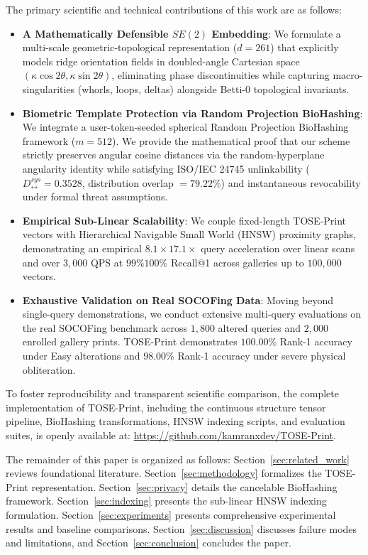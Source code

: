 \documentclass[lettersize,journal]{IEEEtran}
\begin{document}
The primary scientific and technical contributions of this work are as follows:
\begin{itemize}
    \item \textbf{A Mathematically Defensible $SE(2)$ Embedding}: We formulate a multi-scale geometric-topological representation ($d = 261$) that explicitly models ridge orientation fields in doubled-angle Cartesian space $(\kappa \cos 2\theta, \kappa \sin 2\theta)$, eliminating phase discontinuities while capturing macro-singularities (whorls, loops, deltas) alongside Betti-0 topological invariants.
    \item \textbf{Biometric Template Protection via Random Projection BioHashing}: We integrate a user-token-seeded spherical Random Projection BioHashing framework ($m = 512$). We provide the mathematical proof that our scheme strictly preserves angular cosine distances via the random-hyperplane angularity identity while satisfying ISO/IEC 24745 unlinkability ($D_{\leftrightarrow}^{sys} = 0.3528$, distribution overlap $= 79.22\%$) and instantaneous revocability under formal threat assumptions.
    \item \textbf{Empirical Sub-Linear Scalability}: We couple fixed-length TOSE-Print vectors with Hierarchical Navigable Small World (HNSW) proximity graphs, demonstrating an empirical $8.1\times$\textendash$17.1\times$ query acceleration over linear scans and over $3,000$ QPS at $99\%$\textendash$100\%$ Recall@1 across galleries up to $100,000$ vectors.
    \item \textbf{Exhaustive Validation on Real SOCOFing Data}: Moving beyond single-query demonstrations, we conduct extensive multi-query evaluations on the real SOCOFing benchmark across $1,800$ altered queries and $2,000$ enrolled gallery prints. TOSE-Print demonstrates $100.00\%$ Rank-1 accuracy under Easy alterations and $98.00\%$ Rank-1 accuracy under severe physical obliteration.
\end{itemize}

To foster reproducibility and transparent scientific comparison, the complete implementation of TOSE-Print, including the continuous structure tensor pipeline, BioHashing transformations, HNSW indexing scripts, and evaluation suites, is openly available at: \url{https://github.com/kamranxdev/TOSE-Print}.

The remainder of this paper is organized as follows: Section~\ref{sec:related_work} reviews foundational literature. Section~\ref{sec:methodology} formalizes the TOSE-Print representation. Section~\ref{sec:privacy} details the cancelable BioHashing framework. Section~\ref{sec:indexing} presents the sub-linear HNSW indexing formulation. Section~\ref{sec:experiments} presents comprehensive experimental results and baseline comparisons. Section~\ref{sec:discussion} discusses failure modes and limitations, and Section~\ref{sec:conclusion} concludes the paper.
\end{document}
